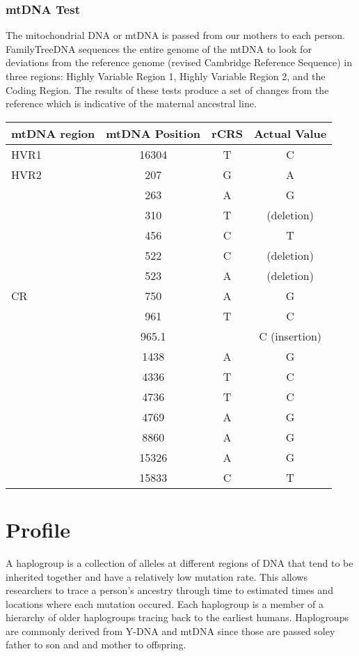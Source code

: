 \documentclass[11pt,letter]{book}
\begin{document}
\subsection{mtDNA Test}

The mitochondrial DNA or mtDNA is passed from our mothers to each person.  FamilyTreeDNA sequences the entire genome of the mtDNA to look for deviations from the reference genome (revised Cambridge Reference Sequence) in three regions: Highly Variable Region 1, Highly Variable Region 2, and the Coding Region.  The results of these tests produce a set of changes from the reference which is indicative of the maternal ancestral line.

\begin{center}
\begin{tabular}{l | c | c | c}
	mtDNA region & mtDNA Position & rCRS & Actual Value \\
	\hline
	 HVR1 & 16304 & T & C \\
	 HVR2 & 207 & G & A \\
	 & 263 & A & G \\
	 & 310 & T & (deletion) \\
	 & 456 & C & T \\
	 & 522 & C & (deletion) \\
	 & 523 & A & (deletion) \\
	 CR & 750 & A & G \\
	 & 961 & T & C \\
	 & 965.1 & & C (insertion) \\
	 & 1438 & A & G \\
	 & 4336 & T & C \\
	 & 4736 & T & C \\
	 & 4769 & A & G \\
	 & 8860 & A & G \\
	 & 15326 & A & G \\
	 & 15833 & C & T \\
\end{tabular}
\end{center}

\chapter{Profile}

A haplogroup is a collection of alleles at different regions of DNA that tend to be inherited together and have a relatively low mutation rate.  This allows researchers to trace a person's ancestry through time to estimated times and locations where each mutation occured.  Each haplogroup is a member of a hierarchy of older haplogroups tracing back to the earliest humans.  Haplogroups are commonly derived from Y-DNA and mtDNA since those are passed soley father to son and and mother to offspring.
\end{document}
